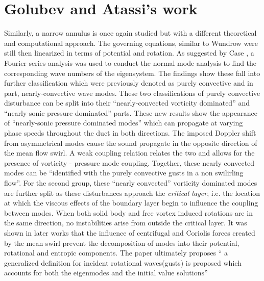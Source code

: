 \section{Golubev and Atassi's work}
Similarly, a narrow annulus is once again 
studied but with a different theoretical and computational approach. The governing equations, similar to Wundrow \cite{
Wundrow2019} were still then linearized in terms of potential and rotation. As suggested by Case \cite{Case1960}, a Fourier series analysis was used to conduct the normal mode analysis to find the corresponding wave numbers 
of the eigensystem. The findings show these fall into further classification which were previously denoted as purely convective and 
in part, nearly-convective wave modes. These two classifications of purely convective disturbance can be split into 
their ``nearly-convected vorticity dominated'' and ``nearly-sonic pressure dominated'' parts. These new 
results show the appearance of ``nearly-sonic pressure dominated modes'' which can propagate at varying phase speeds 
throughout the duct in both directions. The imposed Doppler shift from asymmetrical modes cause the sound propagate in the 
opposite direction of the mean flow swirl. A weak coupling relation relates the two and allows for the presence 
of vorticity - pressure mode coupling. Together, these nearly convected modes can be ``identified with the purely 
convective gusts in a non swilirling flow''. For the second group, these ``nearly convected'' vorticity dominated 
modes are further split as these disturbances approach the \textit{critical layer}, i.e. the 
location at which the viscous effects of the boundary layer begin to influence the coupling between modes. When both 
solid body and free vortex induced rotations are in the same direction, no instabilities arise from outside the critical 
layer. It was shown in later works that the influence of centrifugal and Coriolis forces created by the mean 
swirl prevent the decomposition of modes into their potential, rotational and entropic components. The paper ultimately proposes ``
a generalized definition for incident rotational waves(gusts) is proposed which accounts for both the eigenmodes and the 
initial value solutions'' 
